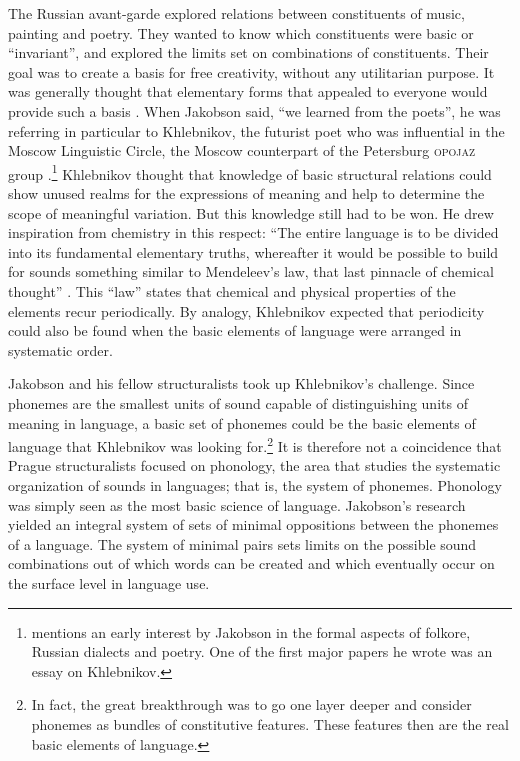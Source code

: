 \documentclass[output=paper]{langscibook}
\begin{document}
The Russian avant-garde explored relations between constituents of music, painting and poetry. They wanted to know which constituents were basic or ``invariant'', and explored the limits set on combinations of constituents. Their goal was to create a basis for free creativity, without any utilitarian purpose. It was generally thought that elementary forms that appealed to everyone would provide such a basis \citep[238--239]{Toman1995}. When Jakobson said, ``we learned from the poets'', he was referring in particular to Khlebnikov, the futurist poet who was influential in the Moscow Linguistic Circle, the Moscow counterpart of the Petersburg \textsc{opojaz} group \citep[see][]{Jakobson1979}.\footnote{ \citet[10--11]{Toman1995} mentions an early interest by Jakobson in the formal aspects of folkore, Russian dialects and poetry. One of the first major papers he wrote was an essay on Khlebnikov.} Khlebnikov thought that know\-ledge of basic structural relations could show unused realms for the expressions of meaning and help to determine the scope of meaningful variation. But this know\-ledge still had to be won. He drew inspiration from chemistry in this respect: ``The entire language is to be divided into its fundamental elementary truths, whereafter it would be possible to build for sounds something similar to Mendeleev's law, that last pinnacle of chemical thought'' \citep[Khlebnikov as translated in][95]{Gasparov2014}. This ``law'' states that chemical and physical properties of the elements recur periodically. By analogy, Khlebnikov expected that periodicity could also be found when the basic elements of language were arranged in systematic order. 

Jakobson and his fellow structuralists took up Khlebnikov's challenge. Since phonemes are the smallest units of sound capable of distinguishing units of meaning in language, a basic set of phonemes could be the basic elements of language that Khlebnikov was looking for.\footnote{In fact, the great breakthrough was to go one layer deeper and consider phonemes as bundles of constitutive features. These features then are the real basic elements of language.} It is therefore not a coincidence that Prague structuralists focused on phonology, the area that studies the systematic organization of sounds in languages; that is, the system of phonemes. Phonology was simply seen as the most basic science of language. Jakobson's research yielded an integral system of sets of minimal oppositions between the phonemes of a language. The system of minimal pairs sets limits on the possible sound combinations out of which words can be created and which eventually occur on the surface level in language use. 
\end{document}

